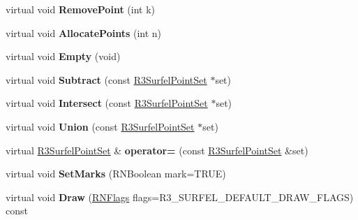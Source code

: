 \begin{DoxyCompactItemize}
\item 
virtual void {\bfseries Remove\+Point} (int k)\hypertarget{class_r3_surfel_point_set_a558fa6f14f426bdd438b9aa7a5e78c09}{}\label{class_r3_surfel_point_set_a558fa6f14f426bdd438b9aa7a5e78c09}

\item 
virtual void {\bfseries Allocate\+Points} (int n)\hypertarget{class_r3_surfel_point_set_a58005f0f226a99da8099e19c088aefe9}{}\label{class_r3_surfel_point_set_a58005f0f226a99da8099e19c088aefe9}

\item 
virtual void {\bfseries Empty} (void)\hypertarget{class_r3_surfel_point_set_a4f07e26ca82716a8e391555bbafc55f9}{}\label{class_r3_surfel_point_set_a4f07e26ca82716a8e391555bbafc55f9}

\item 
virtual void {\bfseries Subtract} (const \hyperlink{class_r3_surfel_point_set}{R3\+Surfel\+Point\+Set} $\ast$set)\hypertarget{class_r3_surfel_point_set_a0eb65517fb6150986c2e988b73f7f560}{}\label{class_r3_surfel_point_set_a0eb65517fb6150986c2e988b73f7f560}

\item 
virtual void {\bfseries Intersect} (const \hyperlink{class_r3_surfel_point_set}{R3\+Surfel\+Point\+Set} $\ast$set)\hypertarget{class_r3_surfel_point_set_a440d55bc0cbb86c2dab84c65921d8aa9}{}\label{class_r3_surfel_point_set_a440d55bc0cbb86c2dab84c65921d8aa9}

\item 
virtual void {\bfseries Union} (const \hyperlink{class_r3_surfel_point_set}{R3\+Surfel\+Point\+Set} $\ast$set)\hypertarget{class_r3_surfel_point_set_acac319235d6d514e088e4cf592c096ff}{}\label{class_r3_surfel_point_set_acac319235d6d514e088e4cf592c096ff}

\item 
virtual \hyperlink{class_r3_surfel_point_set}{R3\+Surfel\+Point\+Set} \& {\bfseries operator=} (const \hyperlink{class_r3_surfel_point_set}{R3\+Surfel\+Point\+Set} \&set)\hypertarget{class_r3_surfel_point_set_a517e427ddf4b8b0b4e290fd3db6423e2}{}\label{class_r3_surfel_point_set_a517e427ddf4b8b0b4e290fd3db6423e2}

\item 
virtual void {\bfseries Set\+Marks} (R\+N\+Boolean mark=T\+R\+UE)\hypertarget{class_r3_surfel_point_set_a194c84a71dca58b3b783063a63aff3a6}{}\label{class_r3_surfel_point_set_a194c84a71dca58b3b783063a63aff3a6}

\item 
virtual void {\bfseries Draw} (\hyperlink{class_r_n_flags}{R\+N\+Flags} flags=R3\+\_\+\+S\+U\+R\+F\+E\+L\+\_\+\+D\+E\+F\+A\+U\+L\+T\+\_\+\+D\+R\+A\+W\+\_\+\+F\+L\+A\+GS) const \hypertarget{class_r3_surfel_point_set_a29089bcce564d0f7c0001fde3c9fdd3b}{}\label{class_r3_surfel_point_set_a29089bcce564d0f7c0001fde3c9fdd3b}


\end{DoxyCompactItemize}
